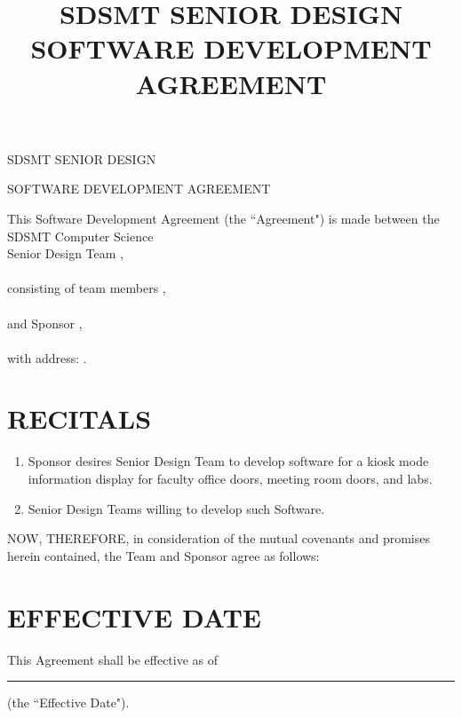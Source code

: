 \documentclass[11pt]{article}
\title{SDSMT SENIOR DESIGN SOFTWARE DEVELOPMENT AGREEMENT}
\begin{document}


{\Large \bf 
\centerline{SDSMT SENIOR DESIGN}\centerline{SOFTWARE DEVELOPMENT AGREEMENT}
}
\vspace{\baselineskip}

This Software Development Agreement (the ``Agreement") is made between the SDSMT  Computer Science\\[3mm] Senior Design Team  \hrulefill, \\[-1mm]  \hspace*{9cm} \\[3mm]
consisting of team members  \hrulefill,  \\[-1mm]  \hspace*{9cm} \\[3mm]
 and  Sponsor \hrulefill,  \\[-1mm]  \hspace*{9cm} \\[3mm]
 with address: \hrulefill . 

\section{RECITALS}
\begin{enumerate}  \itemsep4pt \parskip0pt 
\item Sponsor desires Senior Design Team to develop software for a kiosk mode information display for faculty office doors, meeting room doors, and labs.    

\item Senior Design Teams willing to develop such Software.  
\end{enumerate}
NOW, THEREFORE, in consideration of the mutual covenants and promises herein contained, the Team and Sponsor agree as follows:  

\section{EFFECTIVE DATE }

This Agreement shall be effective as of \rule{4cm}{0.4pt}  (the ``Effective Date").  
\end{document}
